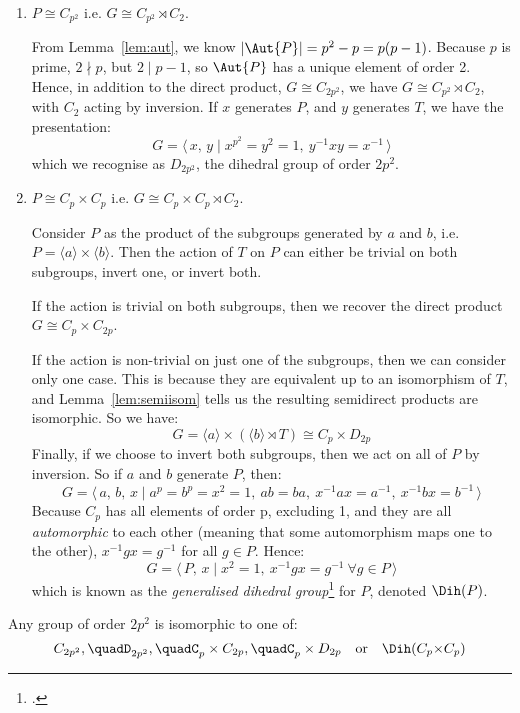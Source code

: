 \begin{enumerate}
    \item \(P \cong C_{p^2}\) i.e. \(G \cong C_{p^2} \rtimes C_2\).

        From Lemma~\ref{lem:aut}, we know \(|\Aut{P}| = p^2 - p = p(p-1)\).
        Because \(p\) is prime, \(2 \nmid p\), but \( 2 \mid p - 1\), so \(\Aut{P}\) has a unique element of order 2.
        Hence, in addition to the direct product, \(G \cong C_{2p^2}\), we have \(G \cong C_{p^2} \rtimes C_2\),
        with \(C_2\) acting by inversion.
        If \(x\) generates \(P\), and \(y\) generates \(T\), we have the presentation:
        \[G = \langle\, x,\,y \mid x^{p^2} = y^2 = 1,\ y^{-1}xy = x^{-1}\,\rangle\]
        which we recognise as \(D_{2p^2}\), the dihedral group of order \(2p^2\).
    \item \(P \cong C_p \times C_p\) i.e. \(G \cong C_p \times C_p \rtimes C_2\).

        Consider \(P\) as the product of the subgroups generated by \(a\) and \(b\), i.e. \(P = \langle a \rangle \times
        \langle b \rangle\).
        Then the action of \(T\) on \(P\) can either be trivial on both subgroups, invert one, or invert both.

        If the action is trivial on both subgroups, then we recover the direct product \(G \cong C_p \times C_{2p}\).

        If the action is non-trivial on just one of the subgroups, then we can consider only one case.
        This is because they are equivalent up to an isomorphism of \(T\), and Lemma~\ref{lem:semiisom} tells us the
        resulting semidirect products are isomorphic.
        So we have:
        \[G = \langle a \rangle \times (\langle b \rangle \rtimes T) \cong C_p \times D_{2p}\]
        Finally, if we choose to invert both subgroups, then we act on all of \(P\) by inversion.
        So if \(a\) and \(b\) generate \(P\), then:
        \[G = \langle\, a,\,b,\,x \mid a^p = b^p = x^2 = 1,\ ab = ba,\ x^{-1}ax = a^{-1},\ x^{-1}bx = b^{-1}\,\rangle\]
        Because \(C_p\) has all elements of order p, excluding 1, and they are all \emph{automorphic} to each other (meaning
        that some automorphism maps one to the other), \(x^{-1}gx = g^{-1}\) for all \(g \in P\).
        Hence:
        \[G = \langle\, P,\,x \mid x^2 = 1,\ x^{-1}gx = g^{-1}\ \forall g \in P \,\rangle\]
        which is known as the \emph{generalised dihedral group}\footcite{gendihedral} for \(P\), denoted \(\Dih(P)\).
\end{enumerate}


\begin{mdframed}[align=center,nobreak=true]
    \begin{center}
        Any group of order \(2p^2\) is isomorphic to one of:
        \[%
            C_{2p^2}, \quad%
            D_{2p^2}, \quad%
            C_p \times C_{2p}, \quad%
            C_p \times D_{2p} \quad \text{or} \quad%
            \Dih(C_p {\times} C_p)
        \]
    \end{center}
\end{mdframed}
